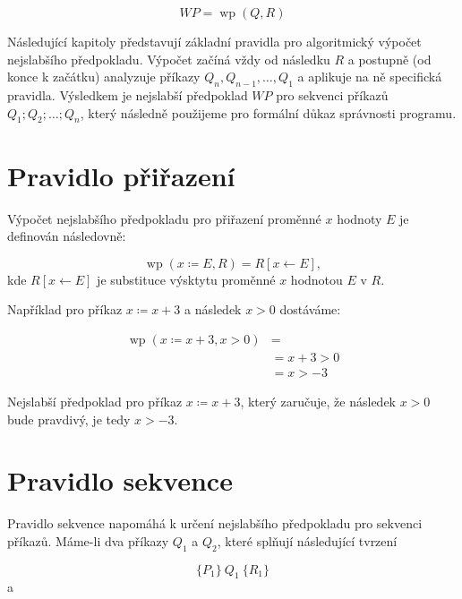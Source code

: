 \begin{equation*}
    \mathit{WP} = \operatorname{wp}(Q, R)
\end{equation*}

Následující kapitoly představují základní pravidla pro algoritmický výpočet nejslabšího předpokladu.
Výpočet začíná vždy od následku $R$ a postupně (od konce k začátku)
analyzuje příkazy $Q_n, Q_{n-1}, \ldots, Q_1$ a aplikuje na ně specifická pravidla.
Výsledkem je nejslabší předpoklad $\mathit{WP}$ pro sekvenci příkazů $Q_1; Q_2; \ldots; Q_n$,
který následně použijeme pro formální důkaz správnosti programu.

\section{Pravidlo přiřazení}
\label{sec:pravidlo-prirazeni}

Výpočet nejslabšího předpokladu pro přiřazení proměnné $x$ hodnoty $E$ je
definován následovně:

\begin{equation*}
    \operatorname{wp}(x \coloneqq E, R) = R[x \leftarrow E],
\end{equation*}
kde $R[x \leftarrow E]$ je substituce výsktytu proměnné $x$ hodnotou $E$ v $R$.

Například pro příkaz $x \coloneqq x + 3$ a následek $x > 0$ dostáváme:

\begin{align*}
    \operatorname{wp}(x \coloneqq x + 3, x > 0) & = \\
                                 & = x + 3 > 0 \\
                                 & = x > -3
\end{align*}

Nejslabší předpoklad pro příkaz $x \coloneqq x + 3$, který zaručuje, že
následek $x > 0$ bude pravdivý, je tedy $x > -3$.

\section{Pravidlo sekvence}
\label{sec:pravidlo-sekvence}

Pravidlo sekvence napomáhá k určení nejslabšího předpokladu pro sekvenci příkazů.
Máme-li dva příkazy $Q_1$ a $Q_2$, které splňují následující tvrzení

\begin{equation*}
    \{ P_1 \} \  Q_1 \  \{ R_1 \}
\end{equation*}
a

